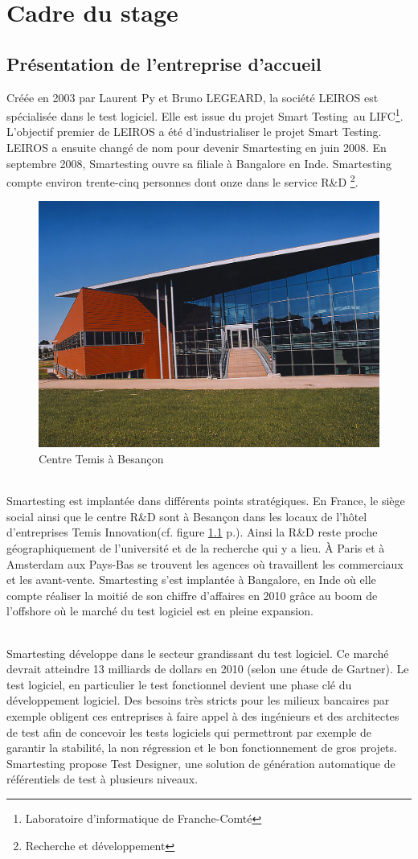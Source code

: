 \chapter{Cadre du stage}

\section{Présentation de l'entreprise d'accueil}
Créée en 2003 par Laurent Py et Bruno LEGEARD, la société LEIROS est spécialisée dans le test logiciel. Elle est issue du projet Smart Testing\texttrademark ~au LIFC\footnote{Laboratoire d'informatique de Franche-Comté}. L'objectif premier de LEIROS a été d'industrialiser le projet Smart Testing\texttrademark.  LEIROS a ensuite changé de nom pour devenir Smartesting en juin 2008. En septembre 2008, Smartesting ouvre sa filiale à Bangalore en Inde. Smartesting compte environ trente-cinq personnes dont onze dans le service R\&D \footnote{Recherche et développement}.

\begin{figure}[!ht]
\centering
\includegraphics[width=.55\textwidth]{Illustrations/temis.jpg}
\caption{Centre Temis à Besançon}
\label{figure:temis}
\end{figure}

\subparagraph*{}
Smartesting est implantée dans différents points stratégiques. En France, le siège social ainsi que le centre R\&D sont à Besançon dans les locaux de l'hôtel d'entreprises Temis Innovation(cf. figure \ref{figure:temis} p.\pageref{figure:temis}). Ainsi la R\&D reste proche géographiquement de l'université et de la recherche qui y a lieu. À Paris et à Amsterdam aux Pays-Bas se trouvent les agences où travaillent les commerciaux et les avant-vente. Smartesting s'est implantée à Bangalore, en Inde où elle compte réaliser la moitié de son chiffre d'affaires en 2010 grâce au boom de l'offshore où le marché du test logiciel est en pleine expansion.

\subparagraph*{}
Smartesting développe dans le secteur grandissant du test logiciel. Ce marché devrait atteindre 13 milliards de dollars en 2010 (selon une étude de Gartner). Le test logiciel, en particulier le test fonctionnel devient une phase clé du développement logiciel. Des besoins très stricts pour les milieux bancaires par exemple obligent ces entreprises à faire appel à des ingénieurs et des architectes de test afin de concevoir les tests logiciels qui permettront par exemple de garantir la stabilité, la non régression et le bon fonctionnement de gros projets. Smartesting propose Test Designer, une solution de génération automatique de référentiels de test à plusieurs niveaux.

